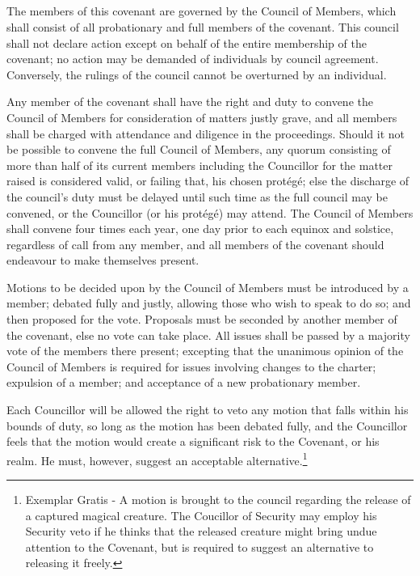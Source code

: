 \documentclass [a3paper,portrait,20pt]{article}
\begin{document}
\begin{multicols}{2}

\begin{small}
\section*{\fontsize{35}{40}\selectfont{Governance of this Covenant}}
	The members of this covenant are governed by the Council of Members, which shall consist of all 
	probationary and full members of the covenant. This council shall not declare action except on behalf 
	of the entire membership of the covenant; no action may be demanded of individuals by council 
	agreement. Conversely, the rulings of the council cannot be overturned by an individual.
	
	Any member of the covenant shall have the right and duty to convene the Council of Members for 
	consideration of matters justly grave, and all members shall be charged with attendance and diligence 
	in the proceedings. Should it not be possible to convene the full Council of Members, any quorum 
	consisting of more than half of its current members including the Councillor for the matter raised is 
	considered valid, or failing that, his chosen prot\'eg\'e; else the discharge of the council’s duty 
	must be delayed until such time as the full council may be convened, or the Councillor (or his 
	prot\'eg\'e) may attend. The Council of Members shall convene four times each year, one day prior to
	each equinox and solstice, regardless of call from any member, and all members of the covenant should
	endeavour to make themselves present.
	
	Motions to be decided upon by the Council of Members must be introduced by a member; debated fully and
	justly, allowing those who wish to speak to do so; and then proposed for the vote. Proposals must be
	seconded by another member of the covenant, else no vote can take place. All issues shall be passed by
	a majority vote of the members there present; excepting that the unanimous opinion of the Council of
	Members is required for issues involving changes to the charter; expulsion of a member; and acceptance
	of a new probationary member.
	
	Each Councillor will be allowed the right to veto any motion that falls within his bounds of duty, so
	long as the motion has been debated fully, and the Councillor feels that the motion would create a
	significant risk to the Covenant,  or his realm. He must, however, suggest an acceptable alternative.\footnote{Exemplar Gratis - A motion is brought to
		the council regarding the release of a captured magical creature. The Coucillor of Security may
		employ his Security veto if he thinks that the released creature might bring undue attention to
		the Covenant, but is required to suggest an alternative to releasing it freely.}
	

\end{small}
\end{multicols}
\end{document}
